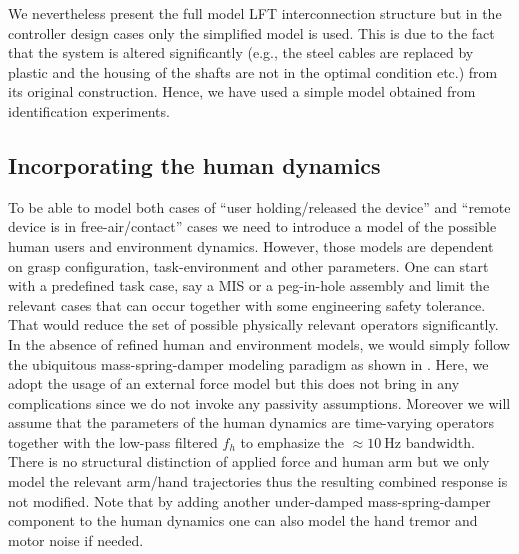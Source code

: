 We nevertheless present the full model LFT interconnection structure but in the controller design cases only the simplified 
model is used. This is due to the fact that the system is altered significantly (e.g., the steel cables are replaced by plastic 
and the housing of the shafts are not in the optimal condition etc.) from its original construction. Hence, we have
used a simple model obtained from identification experiments.



\subsection{Incorporating the human dynamics}
To be able to model both cases of \enquote{user holding/released the device} and \enquote{remote device is in free-air/contact} 
cases we need to introduce a model of the possible human users and environment dynamics. However, those models are dependent on
grasp configuration, task-environment and other parameters. One can start with a predefined task case, say a MIS or a peg-in-hole 
assembly and limit the relevant cases that can occur together with some engineering safety tolerance. That would reduce the 
set of possible physically relevant operators significantly. In the absence of refined human and environment models, we would simply
follow the ubiquitous mass-spring-damper modeling paradigm as shown in . Here, we adopt the usage of an
external force model but this does not bring in any complications since we do not invoke any passivity assumptions. Moreover
we will assume that the parameters of the human dynamics are time-varying operators together with the low-pass filtered $f_h$ to 
emphasize the $\approx \SI{10}{\hertz}$ bandwidth. There is no structural distinction of applied force and human arm but we only 
model the relevant arm/hand trajectories thus the resulting combined response is not modified. Note that by adding another 
under-damped mass-spring-damper component to the human dynamics one can also model the hand tremor and motor noise if needed. 


